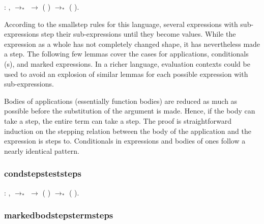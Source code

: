 \documentclass[12pt]{report}
\begin{document}
\begin{coqdoccode}
\coqdocemptyline
\coqdocindent{1.00em}
  : \coqdockw{\ensuremath{\forall}}   ,\coqdoceol
\coqdocindent{2.00em}
 $\to_*$  \ensuremath{\rightarrow}\coqdoceol
\coqdocindent{2.00em}
(  ) $\to_*$ (  ).\coqdoceol
\coqdocemptyline
\end{coqdoccode}

According to the smallstep rules for this language, several
expressions with sub-expressions step their sub-expressions until
they become values. While the expression as a whole has not
completely changed shape, it has nevertheless made a step. The
following few lemmas cover the cases for applications, conditionals
(s), and marked expressions. In a richer language,
evaluation contexts could be used to avoid an explosion of similar
lemmas for each possible expression with sub-expressions. 

Bodies of applications (essentially function bodies) are reduced as
much as possible before the substitution of the argument is made.
Hence, if the body can take a step, the entire term can take a step.
The proof is straightforward induction on the stepping relation
between the body of the application and the expression is steps to.
Conditionals in  expressions and bodies of
 ones follow a nearly identical pattern. 

\subsubsection{condstepsteststeps}

\begin{coqdoccode}
\coqdocemptyline
\coqdocindent{1.00em}
  : \coqdockw{\ensuremath{\forall}}    ,\coqdoceol
\coqdocindent{2.00em}
 $\to_*$  \ensuremath{\rightarrow}\coqdoceol
\coqdocindent{2.00em}
(   ) $\to_*$ (   ).\coqdoceol
\coqdocemptyline
\end{coqdoccode}
\subsubsection{markedbodstepstermsteps}
\end{document}
